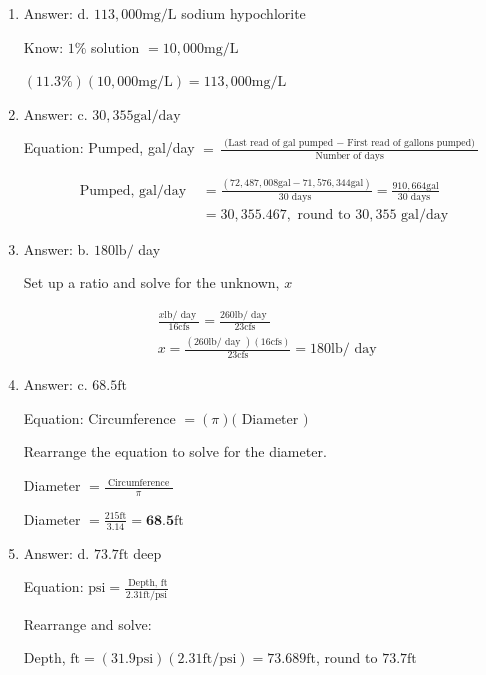 \documentclass[10pt]{article}
\begin{document}
\begin{enumerate}
  \item Answer: d. $113,000 \mathrm{mg} / \mathrm{L}$ sodium hypochlorite

Know: $1 \%$ solution $=10,000 \mathrm{mg} / \mathrm{L}$

$(11.3 \%)(10,000 \mathrm{mg} / \mathrm{L})=113,000 \mathrm{mg} / \mathrm{L}$

  \item Answer: c. $30,355 \mathrm{gal} / \mathrm{day}$

Equation: Pumped, gal/day $=\frac{\text { (Last read of gal pumped }-\text { First read of gallons pumped) }}{\text { Number of days }}$

$$
\begin{aligned}
\text { Pumped, gal/day } &=\frac{(72,487,008 \mathrm{gal}-71,576,344 \mathrm{gal})}{30 \text { days }}=\frac{910,664 \mathrm{gal}}{30 \text { days }} \\
&=30,355.467, \text { round to } 30,355 \text { gal/day }
\end{aligned}
$$

  \item Answer: b. $180 \mathrm{lb} /$ day

Set up a ratio and solve for the unknown, $x$

$$
\begin{aligned}
&\frac{x \mathrm{lb} / \text { day }}{16 \mathrm{cfs}}=\frac{260 \mathrm{lb} / \text { day }}{23 \mathrm{cfs}} \\
&x=\frac{(260 \mathrm{lb} / \text { day })(16 \mathrm{cfs})}{23 \mathrm{cfs}}=180 \mathrm{lb} / \text { day }
\end{aligned}
$$

  \item Answer: c. $68.5 \mathrm{ft}$


Equation: Circumference $=(\pi)($ Diameter $)$

Rearrange the equation to solve for the diameter.

Diameter $=\frac{\text { Circumference }}{\pi}$

Diameter $=\frac{215 \mathrm{ft}}{3.14}=\mathbf{6 8 . 5} \mathrm{ft}$

  \item Answer: d. $73.7 \mathrm{ft}$ deep

Equation: $\mathrm{psi}=\frac{\text { Depth, } \mathrm{ft}}{2.31 \mathrm{ft} / \mathrm{psi}}$

Rearrange and solve:

Depth, $\mathrm{ft}=(31.9 \mathrm{psi})(2.31 \mathrm{ft} / \mathrm{psi})=73.689 \mathrm{ft}$, round to $73.7 \mathrm{ft}$


\end{enumerate}
\end{document}
